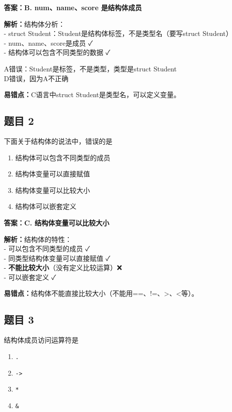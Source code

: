 \documentclass[12pt,a4paper]{ctexart}
\begin{document}
\begin{answerbox}
	\textbf{答案：B. num、name、score 是结构体成员}

	\textbf{解析：}结构体分析：\\
	- struct Student：Student是结构体标签，不是类型名（要写struct Student）\\
	- num、name、score是成员 ✓\\
	- 结构体可以包含不同类型的数据 ✓

	A错误：Student是标签，不是类型，类型是struct Student\\
	D错误，因为A不正确

	\textbf{易错点：}C语言中struct Student是类型名，可以定义变量。
\end{answerbox}

\subsection*{题目 2}
下面关于结构体的说法中，错误的是
\begin{enumerate}[label=\Alph*.]
	\item 结构体可以包含不同类型的成员
	\item 结构体变量可以直接赋值
	\item 结构体变量可以比较大小
	\item 结构体可以嵌套定义
\end{enumerate}

\begin{answerbox}
	\textbf{答案：C. 结构体变量可以比较大小}

	\textbf{解析：}结构体的特性：\\
	- 可以包含不同类型的成员 ✓\\
	- 同类型结构体变量可以直接赋值 ✓\\
	- \textbf{不能比较大小}（没有定义比较运算）❌\\
	- 可以嵌套定义 ✓

	\textbf{易错点：}结构体不能直接比较大小（不能用==、!=、>、<等）。
\end{answerbox}

\subsection*{题目 3}
结构体成员访问运算符是
\begin{enumerate}[label=\Alph*.]
	\item \texttt{.}
	\item \texttt{->}
	\item \texttt{*}
	\item \texttt{\&}
\end{enumerate}
\end{document}
